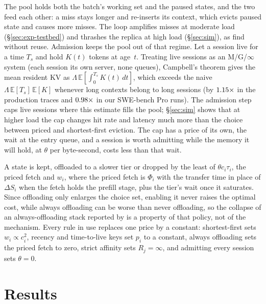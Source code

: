 \documentclass{article}
\newcommand{\leanref}[1]{}
\newcommand{\provedby}[1]{}
\theoremstyle{plain}
\theoremstyle{definition}
\theoremstyle{remark}
\newcommand{\E}{\mathbb{E}}
\begin{document}
The pool holds both the batch's working set and the paused states,
and the two feed each other: a miss stays longer and re-inserts its
context, which evicts paused state and causes more misses. The loop
amplifies misses at moderate load (\S\ref{sec:exp-testbed}) and
thrashes the replica at high load (\S\ref{sec:sim}), as
\citet{ao2026congestion} find without reuse. Admission keeps the pool
out of that regime. Let a session live for a time $T_s$ and hold $K(t)$ tokens at
age~$t$. Treating live sessions as an M/G/$\infty$ system (each session
its own server, none queues), Campbell's theorem \citep{kingman1993}
gives the mean resident KV as $\Lambda\,\E[\int_0^{T_s}K(t)\,dt]$,
which exceeds the naive $\Lambda\,\E[T_s]\,\E[K]$ whenever
long contexts belong to long sessions (by $1.15\times$ in the
production traces and $0.98\times$ in our SWE-bench Pro runs).
The admission step caps live sessions where this estimate fills the
pool; \S\ref{sec:sim} shows that at higher load the cap changes hit rate
and latency much more than the choice between priced and shortest-first eviction. The cap has a price of its own, the wait at the entry queue, and a
session is worth admitting while the memory it will hold, at $\theta$
per byte-second, costs less than that wait.

A state is kept, offloaded to a slower tier or dropped by the least of
$\theta c_i\tau_i$, the priced fetch and $w_i$, where the priced fetch is $\Phi_i$ with the
transfer time in place of $\Delta S_i$ when the fetch holds the prefill
stage, plus the tier's wait once it saturates. Since offloading only
enlarges the choice set, enabling it never raises the optimal cost,
while always offloading can be worse than never
offloading,\provedby{\leanref{optimal\_cost\_antitone\_in\_actions}, \leanref{enabling\_offload\_never\_hurts}, \leanref{always\_offload\_can\_be\_worse}}
so the collapse of an always-offloading stack reported by
\citet[App.~A.2]{thunderagent} is a property of that policy, not of
the mechanism. Every rule in use replaces one price by a
constant: shortest-first sets $w_i\propto c_i^2$, recency and time-to-live
keys set $p_i$ to a constant, always offloading sets the priced fetch
to zero, strict affinity sets $R_j=\infty$, and admitting every session
sets $\theta=0$.

\section{Results}\label{sec:exp}
\end{document}
